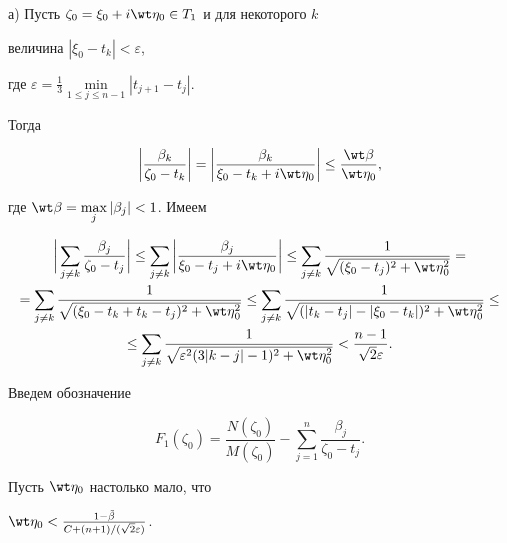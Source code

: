а) Пусть $\zeta_0=\xi_0+i\wt\eta_0\in T_1$ и для некоторого $k$ 


величина $|\xi_0-t_k|<\varepsilon$, 


где $\varepsilon=\frac{1}{3}\min\limits_{1\le j\le n-1}|t_{j+1}-t_j|$.


Тогда 


$$ 


\bigg|\frac{\beta_k}{\zeta_0-t_k} \bigg|= 


\bigg|\frac{\beta_k}{\xi_0-t_k+i\wt\eta_0} \bigg| 


\le\frac{\wt\beta}{\wt\eta_0}, 


$$ 


где $\wt\beta=\max\limits_j|\beta_j|<1$. Имеем 


\begin{multline*} 


\bigg|\sum_{j\ne k}\frac{\beta_j}{\zeta_0-t_j} \bigg|\le 


\sum_{j\ne k}\bigg|\frac{\beta_j}{\xi_0-t_j+i\wt\eta_0} \bigg| 


\le\sum_{j\ne k}\frac{1}{\sqrt{(\xi_0-t_j)^2+\wt\eta{}^2_0}}= \\ 


% 


=\sum_{j\ne k}\frac{1}{\sqrt{(\xi_0-t_k+t_k-t_j)^2+\wt\eta{}^2_0}} 


\le\sum_{j\ne k}\frac{1}{\sqrt{(|t_k-t_j|-|\xi_0-t_k|)^2+ 


\wt\eta{}^2_0}} \le \\ 


% 


\le\sum_{j\ne k}\frac{1}{\sqrt{\varepsilon^2(3|k-j|-1)^2 


+\wt\eta^2_0}}<\frac{n-1}{\sqrt{2}\varepsilon}. 


\end{multline*} 


 


Введем обозначение 


$$ 


F_1(\zeta_0)=\frac{N(\zeta_0)}{M(\zeta_0)}- 


\sum^n_{j=1}\frac{\beta_j}{\zeta_0-t_j}. 


$$ 


 


Пусть $\wt\eta_0$ настолько мало, что 


$\wt\eta_0<\frac{1-\Tilde\beta}{C+(n+1)/(\sqrt{2}\varepsilon)}$. 


